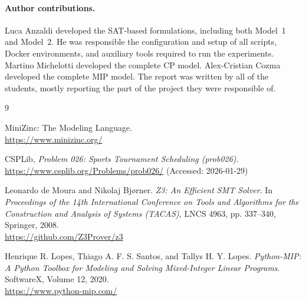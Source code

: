 \documentclass{article}
\begin{document}
\paragraph{Author contributions.}
Luca Anzaldi developed the SAT-based formulations, including both Model~1 and
Model~2. He was responsible the
configuration and setup of all scripts, Docker environments, and auxiliary
tools required to run the experiments.
Martino Michelotti developed the complete CP model.
Alex-Cristian Cozma developed the complete MIP model.
The report was written by all of the students, mostly reporting the part of the project they were responsible of.

\begin{thebibliography}{9}

MiniZinc: The Modeling Language.\\
\url{https://www.minizinc.org/}

CSPLib, \emph{Problem 026: Sports Tournament Scheduling (prob026)}.\\
\url{https://www.csplib.org/Problems/prob026/}
(Accessed: 2026-01-29)

Leonardo de Moura and Nikolaj Bj{\o}rner.
\emph{Z3: An Efficient SMT Solver}.
In \emph{Proceedings of the 14th International Conference on Tools and Algorithms for the Construction and Analysis of Systems (TACAS)}, 
LNCS 4963, pp. 337--340, Springer, 2008.\\
\url{https://github.com/Z3Prover/z3}

Henrique R. Lopes, Thiago A. F. S. Santos, and Tallys H. Y. Lopes.
\emph{Python-MIP: A Python Toolbox for Modeling and Solving Mixed-Integer Linear Programs}.
SoftwareX, Volume 12, 2020.\\
\url{https://www.python-mip.com/}


\end{thebibliography}
\end{document}

